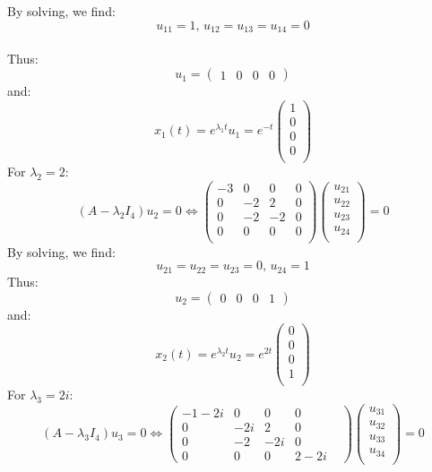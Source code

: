 \documentclass{article}
\begin{document}
By solving, we find: \\
$$u_{11} = 1, \, u_{12} = u_{13} = u_{14} = 0 $$ \\
Thus:
$$u_{1} = 
\begin{pmatrix}
    1 & 0 & 0 & 0
\end{pmatrix}$$
and:
$$x_1(t) = e^{\lambda_{1}t}u_{1} = e^{-t}
\begin{pmatrix}
    1 \\
    0 \\
    0 \\
    0 \\
\end{pmatrix}$$
For $\lambda_{2} = 2:$
$$(A-\lambda_{2}I_{4})u_{2} = 0 \iff 
\begin{pmatrix}
    -3 & 0 & 0 & 0 \\
    0 & -2 & 2 & 0 \\
    0 &-2 & -2 & 0 \\
    0 & 0 & 0 & 0 \\
\end{pmatrix}
\begin{pmatrix}
    u_{21} \\
    u_{22} \\
    u_{23} \\
    u_{24} \\
\end{pmatrix} 
= 0$$
By solving, we find:
$$u_{21} = u_{22} = u_{23} = 0, \, u_{24} = 1$$
Thus:
$$u_{2} = 
\begin{pmatrix}
    0 & 0 & 0 & 1
\end{pmatrix}$$
and:
$$x_{2}(t) = e^{\lambda_{2}t}u_{2} = e^{2t} 
\begin{pmatrix}
    0 \\
    0 \\
    0 \\
    1 \\
\end{pmatrix}$$
For $\lambda_{3} = 2i$: \\
$$(A-\lambda_{3}I_{4})u_{3} = 0 \iff 
\begin{pmatrix}
    -1-2i & 0 & 0 & 0 & \\
    0 & -2i & 2 & 0 \\
    0 & -2 & -2i & 0 \\
    0 & 0 & 0 & 2-2i 
\end{pmatrix}
\begin{pmatrix}
    u_{31} \\
    u_{32} \\
    u_{33} \\
    u_{34} \\
\end{pmatrix}
= 0 $$
\end{document}
